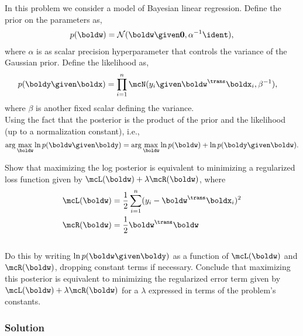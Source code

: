 \documentclass[submit]{harvardml}
\begin{document}
\newpage
\begin{problem}
In this problem we consider a model of Bayesian linear regression. Define the prior on the parameters as,
\begin{align*}
p(\boldw) = \mathcal{N}(\boldw \given \bold0, \alpha^{-1}\ident ),
\end{align*}
where $\alpha$ is as scalar precision hyperparameter that controls the variance of the Gaussian prior.  Define the likelihood as,
\begin{align*}
p(\boldy \given \boldx) &= \prod_{i=1}^n \mcN(y_i \given \boldw^\trans \boldx_i, \beta^{-1}),
\end{align*}
where $\beta$ is another fixed scalar defining the variance. \\


\noindent Using the fact that the posterior is the product of the prior and the likelihood (up to a normalization constant), i.e., 
\[\arg\max_{\boldw} \ln p(\boldw \given \boldy)= \arg\max_{\boldw} \ln p(\boldw) + \ln p(\boldy \given \boldw).\]

\noindent Show that maximizing the log posterior is equivalent to minimizing a regularized loss function given by ${\mcL(\boldw) + \lambda \mcR(\boldw)}$, where
\begin{align*}
\mcL(\boldw) &= \frac{1}{2}\sum_{i = 1}^n (y_i - \boldw^\trans \boldx_i)^2 \\
\mcR(\boldw) &= \frac{1}{2}\boldw^\trans \boldw
\end{align*} \\

\noindent Do this by writing $\ln p(\boldw \given \boldy)$ as a function of $\mcL(\boldw)$ and $\mcR(\boldw)$, dropping constant terms if necessary.  Conclude that maximizing this posterior is equivalent to minimizing the regularized error term given by $\mcL(\boldw) + \lambda \mcR(\boldw)$ for a $\lambda$ expressed in terms of the problem's constants.  
\end{problem}


\subsubsection*{Solution}
\end{document}
